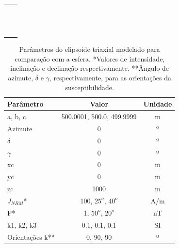 \begin{table}[h!]
	\begin{center}
		\begin{tabular}{lc}
			
			&  \\
			& \\
			& \\
			& \\
			& \\
			& \\
			& \\
			& \\
			& \\
			& \\
			& \\
			& \\
			& \\
		\end{tabular}
	\end{center}
\end{table}

\begin{table}[h!]
	\begin{center}
		\begin{tabular}{|l|c|c|}
			\hline
			\textbf{Parâmetro}  & \textbf{Valor}  & \textbf{Unidade}\\
			\hline 
			a, b, c   & 500.0001, 500.0, 499.9999   & m\\
			\hline
			Azimute   & $0$ & º\\
			\hline
			$\delta$    & $0$ & º\\
			\hline
			$\gamma$   & $0$  & º\\
			\hline
			xc   & 0  & m\\
			\hline          
			yc   & 0  & m\\
			\hline                
			zc   & 1000  & m\\
			\hline
			$J_{NRM}$*  & 100, $25^o$, $40^o$  & A/m\\
			\hline
			F*    & 1, $50^o$, $20^o$ & nT\\
			\hline
			k1, k2, k3   & 0.1, 0.1, 0.1 & SI \\
			\hline
			Orientações k**   & $0$, $90$, $90$  & º\\
			\hline
		\end{tabular}
		\caption{Parâmetros do elipsoide triaxial modelado para comparação com a esfera. *Valores de intensidade, inclinação e declinação respectivamente. **Ângulo de azimute, $\delta$ e $\gamma$, respectivamente, para as orientações da susceptibilidade.}
	\end{center}
	\label{tab:triaxial_sphere}
\end{table}

